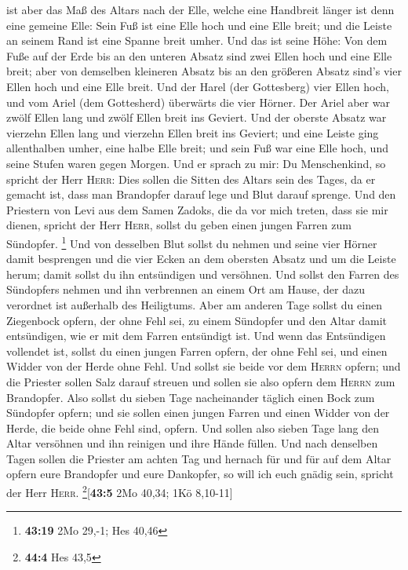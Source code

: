 ist aber das Maß des Altars nach der Elle, welche eine Handbreit länger
ist denn eine gemeine Elle: Sein Fuß ist eine Elle hoch und eine Elle
breit; und die Leiste an seinem Rand ist eine Spanne breit umher.
 Und das ist seine Höhe: Von dem Fuße auf der Erde bis an
den unteren Absatz sind zwei Ellen hoch und eine Elle breit; aber von
demselben kleineren Absatz bis an den größeren Absatz sind's vier Ellen
hoch und eine Elle breit.  Und der Harel (der Gottesberg)
vier Ellen hoch, und vom Ariel (dem Gottesherd) überwärts die vier
Hörner.  Der Ariel aber war zwölf Ellen lang und zwölf
Ellen breit ins Geviert.  Und der oberste Absatz war
vierzehn Ellen lang und vierzehn Ellen breit ins Geviert; und eine
Leiste ging allenthalben umher, eine halbe Elle breit; und sein Fuß war
eine Elle hoch, und seine Stufen waren gegen Morgen.  Und
er sprach zu mir: Du Menschenkind, so spricht der Herr \textsc{Herr}:
Dies sollen die Sitten des Altars sein des Tages, da er gemacht ist,
dass man Brandopfer darauf lege und Blut darauf sprenge. 
Und den Priestern von Levi aus dem Samen Zadoks, die da vor mich treten,
dass sie mir dienen, spricht der Herr \textsc{Herr}, sollst du geben
einen jungen Farren zum Sündopfer. \footnote{\textbf{43:19} 2Mo 29,-1;
  Hes 40,46}  Und von desselben Blut sollst du nehmen und
seine vier Hörner damit besprengen und die vier Ecken an dem obersten
Absatz und um die Leiste herum; damit sollst du ihn entsündigen und
versöhnen.  Und sollst den Farren des Sündopfers nehmen
und ihn verbrennen an einem Ort am Hause, der dazu verordnet ist
außerhalb des Heiligtums.  Aber am anderen Tage sollst du
einen Ziegenbock opfern, der ohne Fehl sei, zu einem Sündopfer und den
Altar damit entsündigen, wie er mit dem Farren entsündigt ist.
 Und wenn das Entsündigen vollendet ist, sollst du einen
jungen Farren opfern, der ohne Fehl sei, und einen Widder von der Herde
ohne Fehl.  Und sollst sie beide vor dem \textsc{Herrn}
opfern; und die Priester sollen Salz darauf streuen und sollen sie also
opfern dem \textsc{Herrn} zum Brandopfer.  Also sollst du
sieben Tage nacheinander täglich einen Bock zum Sündopfer opfern; und
sie sollen einen jungen Farren und einen Widder von der Herde, die beide
ohne Fehl sind, opfern.  Und sollen also sieben Tage lang
den Altar versöhnen und ihn reinigen und ihre Hände füllen.
 Und nach denselben Tagen sollen die Priester am achten
Tag und hernach für und für auf dem Altar opfern eure Brandopfer und
eure Dankopfer, so will ich euch gnädig sein, spricht der Herr
\textsc{Herr}. \footnote{\textbf{44:4} Hes 43,5}{[}\textbf{43:5} 2Mo
40,34; 1Kö 8,10-11{]}

